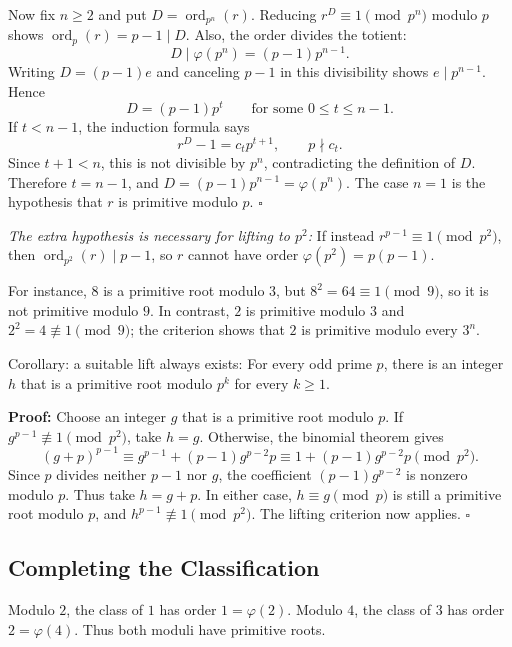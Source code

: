 \documentclass[a4paper,11pt,abstracton]{scrartcl}
\theoremstyle{dotlessP}
\theoremstyle{dotlessS}
\theoremstyle{remark}
\theoremstyle{definition}
\begin{document}
Now fix $n\geq2$ and put $D=\operatorname{ord}_{p^n}(r)$.
Reducing $r^D\equiv1\pmod{p^n}$ modulo $p$ shows
$\operatorname{ord}_p(r)=p-1\mid D$. Also, the order divides the totient:
\[
    D\mid\varphi(p^n)=(p-1)p^{n-1}.
\]
Writing $D=(p-1)e$ and canceling $p-1$ in this divisibility shows
$e\mid p^{n-1}$. Hence
\[
    D=(p-1)p^t\qquad\text{for some }0\leq t\leq n-1.
\]
If $t<n-1$, the induction formula says
\[
    r^D-1=c_t p^{t+1},\qquad p\nmid c_t.
\]
Since $t+1<n$, this is not divisible by $p^n$, contradicting the
definition of $D$. Therefore $t=n-1$, and
$D=(p-1)p^{n-1}=\varphi(p^n)$.
The case $n=1$ is the hypothesis that $r$ is primitive modulo $p$.
\hfill$\square$


\textit{The extra hypothesis is necessary for lifting to $p^2$:}
If instead $r^{p-1}\equiv1\pmod{p^2}$, then
$\operatorname{ord}_{p^2}(r)\mid p-1$, so $r$ cannot have order
$\varphi(p^2)=p(p-1)$.
\begin{example_box}
For instance, $8$ is a primitive root modulo
$3$, but $8^2=64\equiv1\pmod9$, so it is not primitive modulo $9$.
In contrast, $2$ is primitive modulo $3$ and $2^2=4\not\equiv1\pmod9$;
the criterion shows that $2$ is primitive modulo every $3^n$.
\end{example_box}


\begin{mainbox}{Corollary: a suitable lift always exists:}
For every odd prime $p$, there is an integer $h$ that is a primitive
root modulo $p^k$ for every $k\geq1$.
\end{mainbox}

\textbf{Proof:}
Choose an integer $g$ that is a primitive root modulo $p$.
If $g^{p-1}\not\equiv1\pmod{p^2}$, take $h=g$.
Otherwise, the binomial theorem gives
\[
    (g+p)^{p-1}\equiv g^{p-1}+(p-1)g^{p-2}p
      \equiv1+(p-1)g^{p-2}p\pmod{p^2}.
\]
Since $p$ divides neither $p-1$ nor $g$, the coefficient
$(p-1)g^{p-2}$ is nonzero modulo $p$. Thus take $h=g+p$.
In either case, $h\equiv g\pmod p$ is still a primitive root modulo $p$,
and $h^{p-1}\not\equiv1\pmod{p^2}$. The lifting criterion now applies.
\hfill$\square$


\subsection{Completing the Classification}

Modulo $2$, the class of $1$ has order $1=\varphi(2)$.
Modulo $4$, the class of $3$ has order $2=\varphi(4)$.
Thus both moduli have primitive roots.
\end{document}
